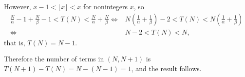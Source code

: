\documentclass[12pt,oneside,a4paper]{book}
\begin{document}
However, $x-1< \lfloor x\rfloor < x$ for nonintegers $x$, so
\begin{align*}
\frac N\alpha - 1 + \frac N\beta - 1 < T(N) < \frac N\alpha + \frac N\beta
\iff &N\left(\frac1\alpha + \frac1\beta\right) - 2 < T(N) < N\left(\frac1\alpha + \frac1\beta\right)\\
\iff &N - 2 < T(N) < N,
\end{align*}
that is, $T(N) = N-1$.

Therefore the number of terms in $(N,N+1)$ is $T(N+1) - T(N) = N - (N-1) = 1$, and the result follows.
\end{document}

